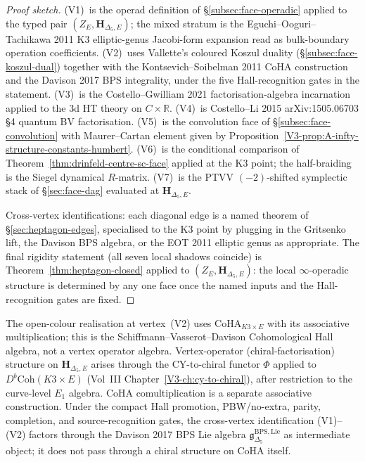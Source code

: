 \begin{proof}[Proof sketch]
(V1)~is the operad definition of \S\ref{subsec:face-operadic} applied
to the typed pair $(Z_E,\mathbf H_{\Delta_5,E})$; the mixed stratum is the
Eguchi--Ooguri--Tachikawa 2011 K3 elliptic-genus Jacobi-form expansion
read as bulk-boundary operation coefficients.
(V2)~uses Vallette's coloured Koszul duality
(\S\ref{subsec:face-koszul-dual}) together with the Kontsevich--Soibelman
2011 CoHA construction and the Davison 2017 BPS integrality, under the
five Hall-recognition gates in the statement.
(V3)~is the Costello--Gwilliam 2021 factorisation-algebra incarnation
applied to the $3$d HT theory on $C \times \mathbb{R}$.
(V4)~is Costello--Li 2015 arXiv:1505.06703 \S 4 quantum BV
factorisation.
(V5)~is the convolution face of \S\ref{subsec:face-convolution} with
Maurer--Cartan element given by
Proposition~\ref{V3-prop:A-infty-structure-constants-humbert}.
(V6)~is the conditional comparison of
Theorem~\ref{thm:drinfeld-centre-sc-face} applied at the K3 point;
the half-braiding is the Siegel dynamical $R$-matrix.
(V7)~is the PTVV $(-2)$-shifted symplectic stack of
\S\ref{sec:face-dag} evaluated at $\mathbf{H}_{\Delta_5,E}$.

Cross-vertex identifications: each diagonal edge is a named theorem of
\S\ref{sec:heptagon-edges}, specialised to the K3 point by plugging in
the Gritsenko lift, the Davison BPS algebra, or the EOT 2011 elliptic
genus as appropriate. The final rigidity statement (all seven local
shadows coincide) is Theorem~\ref{thm:heptagon-closed} applied to
$(Z_E,\mathbf H_{\Delta_5,E})$: the local $\infty$-operadic structure
is determined by any one face once the named inputs and the
Hall-recognition gates are fixed.
\end{proof}

\begin{remark}
\label{rem:heptagon-K3-coha-discipline}
The open-colour realisation at vertex~(V2) uses
$\mathrm{CoHA}_{K3 \times E}$ with its associative multiplication; this
is the Schiffmann--Vasserot--Davison Cohomological Hall algebra, not a
vertex operator algebra. Vertex-operator (chiral-factorisation)
structure on $\mathbf{H}_{\Delta_5,E}$ arises through the
CY-to-chiral functor $\Phi$ applied to $D^b\mathrm{Coh}(K3 \times E)$
(Vol~III Chapter~\ref{V3-ch:cy-to-chiral}), after restriction to the
curve-level $E_1$ algebra. CoHA comultiplication is a separate
associative construction. Under the compact Hall promotion,
PBW/no-extra, parity, completion, and source-recognition gates, the
cross-vertex identification (V1)--(V2) factors through the Davison 2017
BPS Lie algebra
$\mathfrak{g}_{\Delta_5}^{\mathrm{BPS,Lie}}$ as intermediate object;
it does not pass through a chiral structure on CoHA itself.
\end{remark}

